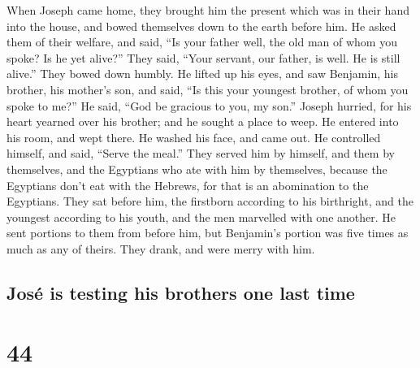  When Joseph came home, they brought him the present
which was in their hand into the house, and bowed themselves down to the
earth before him.  He asked them of their welfare, and
said, ``Is your father well, the old man of whom you spoke? Is he yet
alive?''  They said, ``Your servant, our father, is well.
He is still alive.'' They bowed down humbly.  He lifted
up his eyes, and saw Benjamin, his brother, his mother's son, and said,
``Is this your youngest brother, of whom you spoke to me?'' He said,
``God be gracious to you, my son.''  Joseph hurried, for
his heart yearned over his brother; and he sought a place to weep. He
entered into his room, and wept there.  He washed his
face, and came out. He controlled himself, and said, ``Serve the meal.''
 They served him by himself, and them by themselves, and
the Egyptians who ate with him by themselves, because the Egyptians
don't eat with the Hebrews, for that is an abomination to the Egyptians.
 They sat before him, the firstborn according to his
birthright, and the youngest according to his youth, and the men
marvelled with one another.  He sent portions to them
from before him, but Benjamin's portion was five times as much as any of
theirs. They drank, and were merry with him.

\hypertarget{josuxe9-is-testing-his-brothers-one-last-time}{%
\subsection{José is testing his brothers one last
time}\label{josuxe9-is-testing-his-brothers-one-last-time}}

\hypertarget{section-43}{%
\section{44}\label{section-43}}

